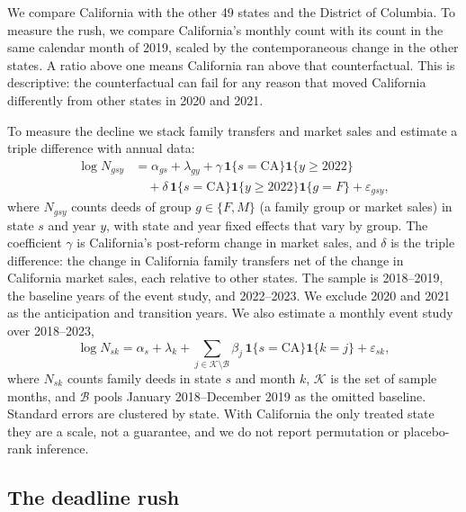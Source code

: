 We compare California with the other 49 states and the District of Columbia. To measure the rush, we compare California's monthly count with its count in the same calendar month of 2019, scaled by the contemporaneous change in the other states. A ratio above one means California ran above that counterfactual. This is descriptive: the counterfactual can fail for any reason that moved California differently from other states in 2020 and 2021.

To measure the decline we stack family transfers and market sales and estimate a triple difference with annual data:
\begin{equation}
 \begin{aligned}
  \log N_{gsy}&=\alpha_{gs}+\lambda_{gy}+
  \gamma\,\mathbf{1}\{s=\mathrm{CA}\}\mathbf{1}\{y\geq 2022\}
  \\
  &\quad+\delta\,\mathbf{1}\{s=\mathrm{CA}\}\mathbf{1}\{y\geq 2022\}\mathbf{1}\{g=F\}
  +\varepsilon_{gsy},
 \end{aligned}
\end{equation}
where $N_{gsy}$ counts deeds of group $g\in\{F,M\}$ (a family group or market sales) in state $s$ and year $y$, with state and year fixed effects that vary by group. The coefficient $\gamma$ is California's post-reform change in market sales, and $\delta$ is the triple difference: the change in California family transfers net of the change in California market sales, each relative to other states. The sample is 2018--2019, the baseline years of the event study, and 2022--2023. We exclude 2020 and 2021 as the anticipation and transition years. We also estimate a monthly event study over 2018--2023,
\begin{equation}
  \log N_{sk}=\alpha_s+\lambda_k+
  \sum_{j\in\mathcal{K}\setminus\mathcal{B}}
  \beta_j\,\mathbf{1}\{s=\mathrm{CA}\}\mathbf{1}\{k=j\}
  +\varepsilon_{sk},
\end{equation}
where $N_{sk}$ counts family deeds in state $s$ and month $k$, $\mathcal{K}$ is the set of sample months, and $\mathcal{B}$ pools January 2018--December 2019 as the omitted baseline. Standard errors are clustered by state. With California the only treated state they are a scale, not a guarantee, and we do not report permutation or placebo-rank inference.

\subsection{The deadline rush}\label{subsec:rush}

